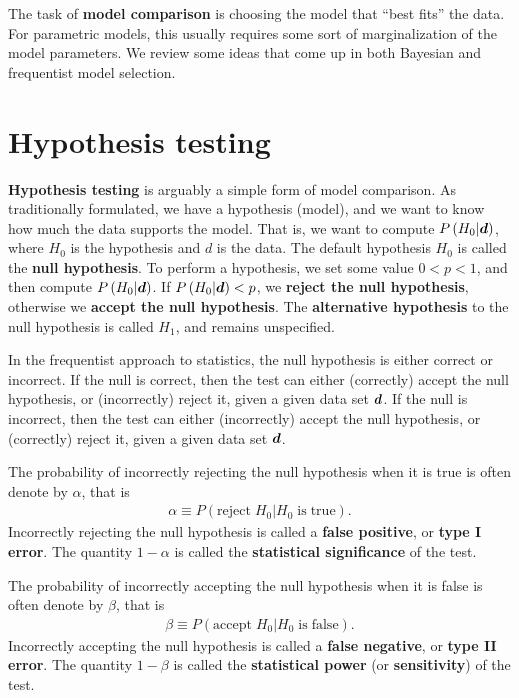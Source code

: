 The task of \textbf{model comparison} is choosing the model that ``best fits'' the data.
For parametric models, this usually requires some sort of marginalization of the model parameters.
We review some ideas that come up in both Bayesian and frequentist model selection.

\section{Hypothesis testing}

\textbf{Hypothesis testing} is arguably a simple form of model comparison.
As traditionally formulated, we have a hypothesis (model), and we want to know how much the data supports the model.
That is, we want to compute $P\left(H_0|{\bm d}\right)$, where $H_0$ is the hypothesis and $d$ is the data.
The default hypothesis $H_0$ is called the \textbf{null hypothesis}.
To perform a hypothesis, we set some value $0<p<1$, and then compute $P\left(H_0|{\bm d}\right)$.
If $P\left(H_0|{\bm d}\right)<p$, we \textbf{reject the null hypothesis}, otherwise we \textbf{accept the null hypothesis}.
The \textbf{alternative hypothesis} to the null hypothesis is called $H_1$, and remains unspecified.

In the frequentist approach to statistics, the null hypothesis is either correct or incorrect.
If the null is correct, then the test can either (correctly) accept the null hypothesis, or (incorrectly) reject it, given a given data set ${\bm d}$.
If the null is incorrect, then the test can either (incorrectly) accept the null hypothesis, or (correctly) reject it, given a given data set ${\bm d}$.

The probability of incorrectly rejecting the null hypothesis when it is true is often denote by $\alpha$, that is
\begin{align}
    \alpha
    \equiv
    P\left(\mathrm{reject}\;H_0|H_0\;\mathrm{is\;true}\right)
    .
\end{align}
Incorrectly rejecting the null hypothesis is called a \textbf{false positive}, or \textbf{type I error}.
The quantity $1-\alpha$ is called the \textbf{statistical significance} of the test.

The probability of incorrectly accepting the null hypothesis when it is false is often denote by $\beta$, that is
\begin{align}
    \beta
    \equiv
    P\left(\mathrm{accept}\;H_0|H_0\;\mathrm{is\;false}\right)
    .
\end{align}
Incorrectly accepting the null hypothesis is called a \textbf{false negative}, or \textbf{type II error}.
The quantity $1-\beta$ is called the \textbf{statistical power} (or \textbf{sensitivity}) of the test.

